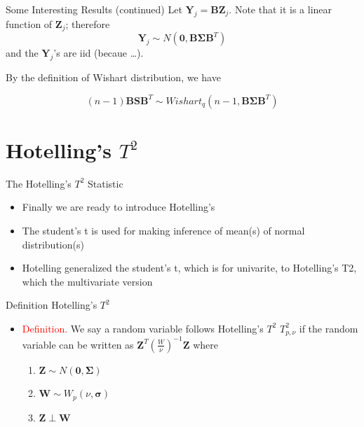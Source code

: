 \documentclass[
  ignorenonframetext,
]{beamer}
\providecommand{\tightlist}{%
  \setlength{\itemsep}{0pt}\setlength{\parskip}{0pt}}
\begin{document}
\begin{frame}{Some Interesting Results (continued)}
\protect\hypertarget{some-interesting-results-continued-1}{}
Let \(\mathbf Y_j=\mathbf B \mathbf Z_j\). Note that it is a linear
function of \(\mathbf Z_j\); therefore
\[\mathbf Y_j\sim N(\mathbf 0, \mathbf B \boldsymbol \Sigma \mathbf B^T)\]
and the \(\mathbf Y_j\)'s are iid (becaue \ldots).

By the definition of Wishart distribution, we have

\[(n-1)\mathbf B \mathbf S \mathbf B^T\sim Wishart_q(n-1, \mathbf B \boldsymbol \Sigma \mathbf B^T)\]
\end{frame}

\hypertarget{hotellings-t2}{%
\section{\texorpdfstring{Hotelling's
\(T^2\)}{Hotelling's T\^{}2}}\label{hotellings-t2}}

\begin{frame}{The Hotelling's \(T^2\) Statistic}
\protect\hypertarget{the-hotellings-t2-statistic}{}
\begin{itemize}
\item
  Finally we are ready to introduce Hotelling's
\item
  The student's t is used for making inference of mean(s) of normal
  distribution(s)
\item
  Hotelling generalized the student's t, which is for univarite, to
  Hotelling's T2, which the multivariate version
\end{itemize}
\end{frame}

\begin{frame}{Definition Hotelling's \(T^2\)}
\protect\hypertarget{definition-hotellings-t2}{}
\begin{itemize}
\tightlist
\item
  \textcolor{red}{Definition. }We say a random variable follows
  Hotelling's \(T^2\) \(T_{p,\nu}^2\) if the random variable can be
  written as \(\mathbf Z^T\left(\frac{W}{\nu}\right)^{-1}\mathbf Z\)
  where

  \begin{enumerate}
  \tightlist
  \item
    \(\mathbf Z\sim N(\mathbf 0, \boldsymbol\Sigma)\)
  \item
    \(\mathbf W \sim W_p(\nu, \boldsymbol\sigma)\)
  \item
    \(\mathbf Z \perp \mathbf W\)
  \end{enumerate}
\end{itemize}
\end{frame}
\end{document}
